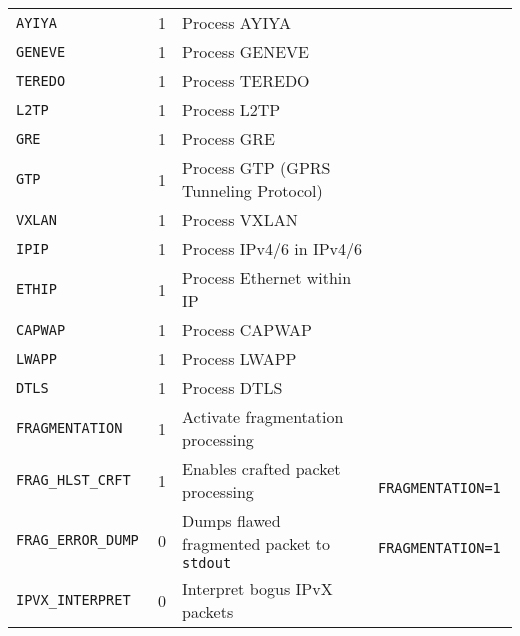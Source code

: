\begin{longtable}{>{\tt}lcl>{\tt\small}l}
    AYIYA                    & 1                  & Process AYIYA                                                       & \\
    GENEVE                   & 1                  & Process GENEVE                                                      & \\
    TEREDO                   & 1                  & Process TEREDO                                                      & \\
    L2TP                     & 1                  & Process L2TP                                                        & \\
    GRE                      & 1                  & Process GRE                                                         & \\
    GTP                      & 1                  & Process GTP (GPRS Tunneling Protocol)                               & \\
    VXLAN                    & 1                  & Process VXLAN                                                       & \\
    IPIP                     & 1                  & Process IPv4/6 in IPv4/6                                            & \\
    ETHIP                    & 1                  & Process Ethernet within IP                                          & \\
    CAPWAP                   & 1                  & Process CAPWAP                                                      & \\
    LWAPP                    & 1                  & Process LWAPP                                                       & \\
    DTLS                     & 1                  & Process DTLS                                                        & \\
    FRAGMENTATION            & 1                  & Activate fragmentation processing                                   & \\
    FRAG\_HLST\_CRFT         & 1                  & Enables crafted packet processing                                   & FRAGMENTATION=1\\
    FRAG\_ERROR\_DUMP        & 0                  & Dumps flawed fragmented packet to {\tt stdout}                      & FRAGMENTATION=1\\
    IPVX\_INTERPRET          & 0                  & Interpret bogus IPvX packets                                        & \\

\end{longtable}

